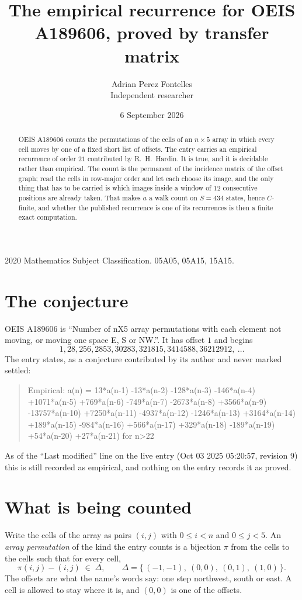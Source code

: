 \documentclass[11pt,a4paper]{article}
\title{The empirical recurrence for OEIS A189606, proved by transfer matrix}
\author{Adrian Perez Fontelles\\ \small Independent researcher}
\date{6 September 2026}
\theoremstyle{plain}
\theoremstyle{definition}
\begin{document}
\maketitle

\begin{abstract}
OEIS A189606 counts the permutations of the cells of an $n\times5$ array in which every cell
moves by one of a fixed short list of offsets. The entry carries an empirical recurrence of
order $21$ contributed by R.~H.~Hardin. It is true, and it is decidable rather than
empirical. The count is the permanent of the incidence matrix of the offset graph; read the
cells in row-major order and let each choose its image, and the only thing that has to be
carried is which images inside a window of $12$ consecutive positions are already taken.
That makes $a$ a walk count on $S=434$ states, hence $C$-finite, and whether the published
recurrence is one of its recurrences is then a finite exact computation.
\end{abstract}

\noindent\small 2020 Mathematics Subject Classification. 05A05, 05A15, 15A15.\normalsize

\section{The conjecture}

OEIS A189606 is ``Number of nX5 array permutations with each element not moving, or moving one space E, S or NW.''. It has offset $1$ and begins
\[
1, 28, 256, 2853, 30283, 321815, 3414588, 36212912,\ \dots
\]
The entry states, as a conjecture contributed by its author and never marked settled:
\begin{quote}
Empirical: a(n) = 13*a(n-1) -13*a(n-2) -128*a(n-3) -146*a(n-4) +1071*a(n-5) +769*a(n-6) -749*a(n-7) -2673*a(n-8) +3566*a(n-9) -13757*a(n-10) +7250*a(n-11) -4937*a(n-12) -1246*a(n-13) +3164*a(n-14) +189*a(n-15) -984*a(n-16) +566*a(n-17) +329*a(n-18) -189*a(n-19) +54*a(n-20) +27*a(n-21) for n>22
\end{quote}
As of the ``Last modified'' line on the live entry (Oct 03 2025 05:20:57, revision 9) this is still
recorded as empirical, and nothing on the entry records it as proved.

\section{What is being counted}

Write the cells of the array as pairs $(i,j)$ with $0\le i<n$ and $0\le j<5$. An
\emph{array permutation} of the kind the entry counts is a bijection $\pi$ from the cells to
the cells such that for every cell,
\[
\pi(i,j)-(i,j)\;\in\;\Delta,\qquad
\Delta=\{\,(-1,-1),\ (0,0),\ (0,1),\ (1,0)\,\}.
\]
The offsets are what the name's words say: one step northwest, south or east. A cell is allowed to stay where it is, and $(0,0)$ is one of the offsets.
\end{document}
